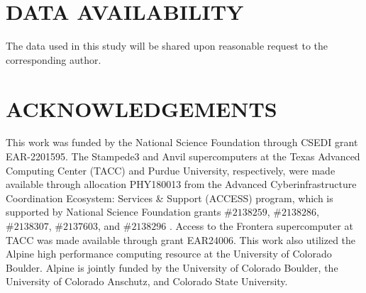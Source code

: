 










\pagebreak

\section*{DATA AVAILABILITY}
The data used in this study will be shared upon reasonable request to the corresponding author.

\section*{ACKNOWLEDGEMENTS}

This work was funded by the National Science Foundation through CSEDI grant EAR-2201595. The Stampede3 and Anvil supercomputers at the Texas Advanced Computing Center (TACC) and Purdue University, respectively, were made available through allocation PHY180013 from the Advanced Cyberinfrastructure Coordination Ecosystem: Services \& Support (ACCESS) program, which is supported by National Science Foundation grants $\#2138259$, $\#2138286$,\\
$\#2138307$, $\#2137603$, and $\#2138296$ \citep{tB23}. Access to the Frontera supercomputer \citep{frontera} at TACC was made available through grant EAR24006. This work also utilized the Alpine high performance computing resource at the University of Colorado Boulder. Alpine is jointly funded by the University of Colorado Boulder, the University of Colorado Anschutz, and Colorado State University.



